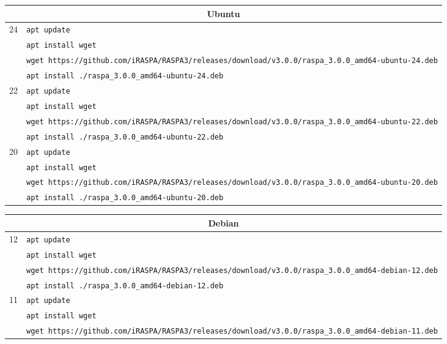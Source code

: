 \begin{table}[p]
\begin{tabularx}{\linewidth}{c|X}
  \end{tabularx}
  \newline
\vspace*{0.5 cm}
\newline
  \begin{tabularx}{\linewidth}{c|X}
  \multicolumn{2}{c}{Ubuntu}\\
   \hline
  24 & \verb+apt update+\\
     & \verb+apt install wget+\\
     & \verb+wget https://github.com/iRASPA/RASPA3/releases/download/v3.0.0/raspa_3.0.0_amd64-ubuntu-24.deb+\\
     & \verb+apt install ./raspa_3.0.0_amd64-ubuntu-24.deb+\\
     \hline
  22 & \verb+apt update+\\
     & \verb+apt install wget+\\
     & \verb+wget https://github.com/iRASPA/RASPA3/releases/download/v3.0.0/raspa_3.0.0_amd64-ubuntu-22.deb+\\
     & \verb+apt install ./raspa_3.0.0_amd64-ubuntu-22.deb+\\
     \hline
  20 & \verb+apt update+\\
     & \verb+apt install wget+\\
     & \verb+wget https://github.com/iRASPA/RASPA3/releases/download/v3.0.0/raspa_3.0.0_amd64-ubuntu-20.deb+\\
     & \verb+apt install ./raspa_3.0.0_amd64-ubuntu-20.deb+\\
  \end{tabularx}
  \newline
\vspace*{0.5 cm}
\newline
  \begin{tabularx}{\linewidth}{c|X}
  \multicolumn{2}{c}{Debian}\\
   \hline
  12 & \verb+apt update+\\
     & \verb+apt install wget+\\
     & \verb+wget https://github.com/iRASPA/RASPA3/releases/download/v3.0.0/raspa_3.0.0_amd64-debian-12.deb+\\
     & \verb+apt install ./raspa_3.0.0_amd64-debian-12.deb+\\
     \hline
  11 & \verb+apt update+\\
     & \verb+apt install wget+\\
     & \verb+wget https://github.com/iRASPA/RASPA3/releases/download/v3.0.0/raspa_3.0.0_amd64-debian-11.deb+\\

\end{tabularx}
\end{table}
